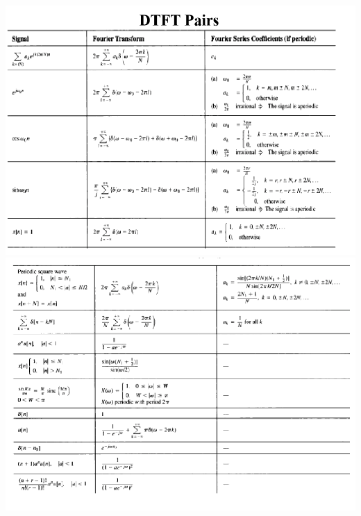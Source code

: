 \documentclass[landscape,a4paper]{article}
\begin{document}
\begin{multicols}{2}
\includegraphics[width=0.9\linewidth]{p10.png}
\includegraphics[width=\linewidth]{p11.png}

\end{multicols}
\end{document}

